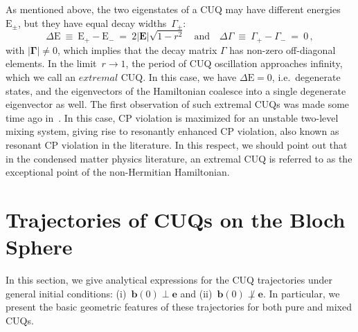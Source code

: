 \documentclass[12pt,a4paper]{article}
\begin{document}
As mentioned above, the two eigenstates of a CUQ may have different energies $\text{E}_\pm$,
but they have equal decay widths~$\Gamma_\pm$\cite{Karamitros:2022oew}:
\begin{equation}
    \Delta \mathrm{E}\: \equiv\: \mathrm{E}_+-\mathrm{E}_-\ =\ 2|\mathbf{E}|\sqrt{1-r^2}\quad \text{and}\quad \Delta\Gamma\: \equiv\: \Gamma_+ - \Gamma_- \: =\: 0\,,
\end{equation}
with $|\boldsymbol{\Gamma}|\neq 0$, which implies that the decay matrix $\Gamma$ has non-zero off-diagonal elements. In the limit~${r\to 1}$, the period of CUQ oscillation approaches infinity, which we call an $\textit{extremal}$ CUQ. In this case, we have $\Delta \mathrm{E} = 0$, i.e.~degenerate states, and the eigenvectors of the Hamiltonian coalesce into a single degenerate eigenvector as well.
The first observation of such extremal CUQs was made some time ago in~\cite{Pilaftsis:1997dr}. In this case, CP violation is maximized for an unstable two-level mixing system, giving rise to resonantly enhanced CP violation, also known as resonant CP violation in the literature. In this respect, we should point out that in the condensed matter physics literature, an extremal CUQ is referred to as the exceptional point\cite{Heiss:2012dx} of the non-Hermitian Hamiltonian.


\section{Trajectories of CUQs on the Bloch Sphere}\label{sec:BlochTrajectory}

In this section, we give analytical expressions for the CUQ trajectories under general initial conditions: (i)~$\mathbf{b}(0)\perp \mathbf{e}$ and (ii)~$\mathbf{b}(0)\not\perp \mathbf{e}$. In particular, we present the basic geometric features of these trajectories for both pure and mixed CUQs. 
\end{document}

